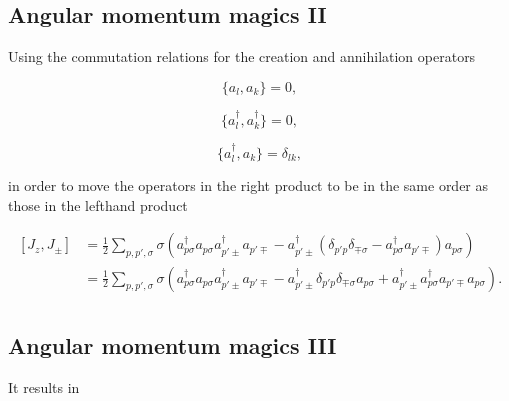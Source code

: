 \documentclass[11pt]{article}
\begin{document}
    \hypertarget{angular-momentum-magics-ii}{%
\subsection{Angular momentum magics
II}\label{angular-momentum-magics-ii}}

Using the commutation relations for the creation and annihilation
operators

    \hypertarget{eq:alux2cak}{}

\[
\begin{equation}
\{ a_l,a_k \} = 0, \label{eq:al,ak} \tag{4} 
\end{equation}
\]

    \hypertarget{eq:aldux2cakd}{}

\[
\begin{equation} 
\{ a_l^\dagger , a_k^\dagger \} = 0, \label{eq:ald,akd} \tag{5} 
\end{equation}
\]

    \hypertarget{eq:aldux2cak}{}

\[
\begin{equation} 
\{ a_l^\dagger , a_k \} = \delta_{lk}, \label{eq:ald,ak} \tag{6}
\end{equation}
\]

    in order to move the operators in the right product to be in the same
order as those in the lefthand product

    \[
\begin{align*}
[J_z,J_\pm] &= \frac{1}{2} \sum_{p,p',\sigma} \sigma \left(
a_{p\sigma}^\dagger a_{p\sigma} a_{p'\pm}^\dagger a_{p'\mp} -
a_{p'\pm}^\dagger \left( \delta_{p' p} \delta_{\mp \sigma} - a_{p\sigma}^\dagger a_{p'\mp} \right) a_{p\sigma} \right) \\
&= \frac{1}{2} \sum_{p,p',\sigma} \sigma \left(
a_{p\sigma}^\dagger a_{p\sigma} a_{p'\pm}^\dagger a_{p'\mp} -
a_{p'\pm}^\dagger \delta_{p' p} \delta_{\mp \sigma} a_{p\sigma} +
a_{p'\pm}^\dagger a_{p\sigma}^\dagger a_{p'\mp} a_{p\sigma} \right). \\
\end{align*}
\]

    \hypertarget{angular-momentum-magics-iii}{%
\subsection{Angular momentum magics
III}\label{angular-momentum-magics-iii}}

It results in
\end{document}
